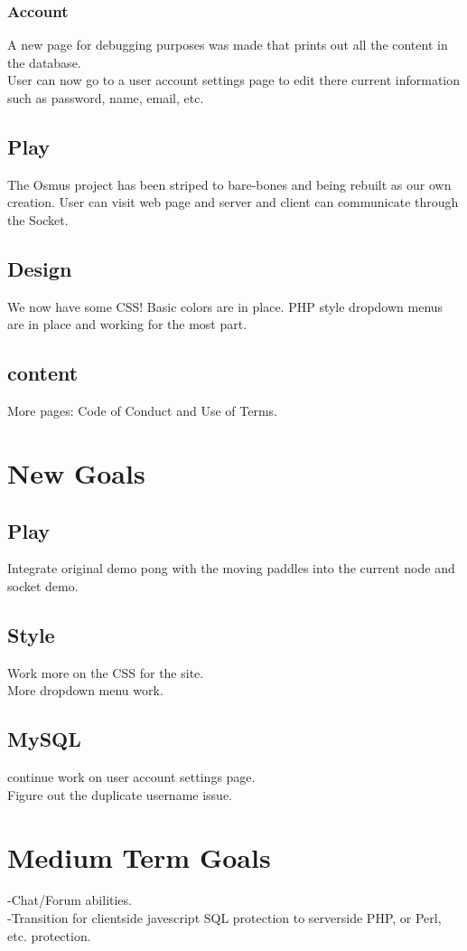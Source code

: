		\subsubsection{Account}
                      A new page for debugging purposes was made that prints out all the content in the database.\\User can now go to a user account settings page to edit there current information such as password, name, email, etc. 
	\subsection{Play}
	The Osmus project has been striped to bare-bones and being rebuilt as our own creation. User can visit web page and server and client can communicate through the Socket.
	\subsection{Design}
	We now have some CSS! Basic colors are in place. PHP style dropdown menus are in place and working for the most part.
	\subsection{content}
	More pages: Code of Conduct and Use of Terms.

\section{New Goals}
	\subsection{Play}
		Integrate original demo pong with the moving paddles into the current node and socket demo.
	\subsection{Style}
		Work more on the CSS for the site.\\More dropdown menu work.
	\subsection{MySQL}
		continue work on user account settings page.\\Figure out the duplicate username issue.
	
\section{Medium Term Goals}
	-Chat/Forum abilities.\\
	-Transition for clientside javescript SQL protection to serverside PHP, or Perl, etc. protection.
